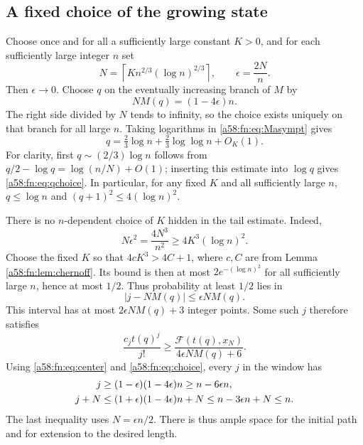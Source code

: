 \documentclass[11pt,letterpaper]{article}
\theoremstyle{remark}
\newcommand{\FF}{\mathcal F}
\begin{document}
\subsection{A fixed choice of the growing state}
Choose once and for all a sufficiently large constant $K>0$, and for each sufficiently large integer $n$ set
\begin{equation}\label{a58:fn:eq:choice}
 N=\left\lceil K n^{2/3}(\log n)^{2/3}\right\rceil,
 \qquad \epsilon=\frac{2N}{n}.
\end{equation}
Then $\epsilon\to0$. Choose $q$ on the eventually increasing branch of $M$ by
\begin{equation}\label{a58:fn:eq:center}
 NM(q)=(1-4\epsilon)n.
\end{equation}
The right side divided by $N$ tends to infinity, so the choice exists uniquely on that branch for all large $n$. Taking logarithms in \eqref{a58:fn:eq:Masympt} gives
\begin{equation}\label{a58:fn:eq:qchoice}
 q=\tfrac23\log n+\tfrac23\log\log n+O_K(1).
\end{equation}
For clarity, first $q\sim(2/3)\log n$ follows from
$q/2-\log q=\log(n/N)+O(1)$; inserting this estimate into $\log q$ gives \eqref{a58:fn:eq:qchoice}. In particular, for any fixed $K$ and all sufficiently large $n$, $q\le\log n$ and $(q+1)^2\le4(\log n)^2$.

There is no $n$-dependent choice of $K$ hidden in the tail estimate. Indeed,
\[
 N\epsilon^2=\frac{4N^3}{n^2}\ge4K^3(\log n)^2.
\]
Choose the fixed $K$ so that $4cK^3>4C+1$, where $c,C$ are from Lemma \ref{a58:fn:lem:chernoff}. Its bound is then at most $2e^{-(\log n)^2}$ for all sufficiently large $n$, hence at most $1/2$. Thus probability at least $1/2$ lies in
\[
 |j-NM(q)|\le\epsilon NM(q).
\]
This interval has at most $2\epsilon NM(q)+3$ integer points. Some such $j$ therefore satisfies
\begin{equation}\label{a58:fn:eq:onecoefficient}
 \frac{c_jt(q)^j}{j!}
 \ge\frac{\FF(t(q),x_N)}{4\epsilon NM(q)+6}.
\end{equation}
Using \eqref{a58:fn:eq:center} and \eqref{a58:fn:eq:choice}, every $j$ in the window has
\begin{align}\label{a58:fn:eq:margins}
 j&\ge(1-\epsilon)(1-4\epsilon)n\ge n-6\epsilon n,\notag\\
 j+N&\le(1+\epsilon)(1-4\epsilon)n+N
       \le n-3\epsilon n+N\le n.
\end{align}
The last inequality uses $N=\epsilon n/2$. There is thus ample space for the initial path and for extension to the desired length.
\end{document}
